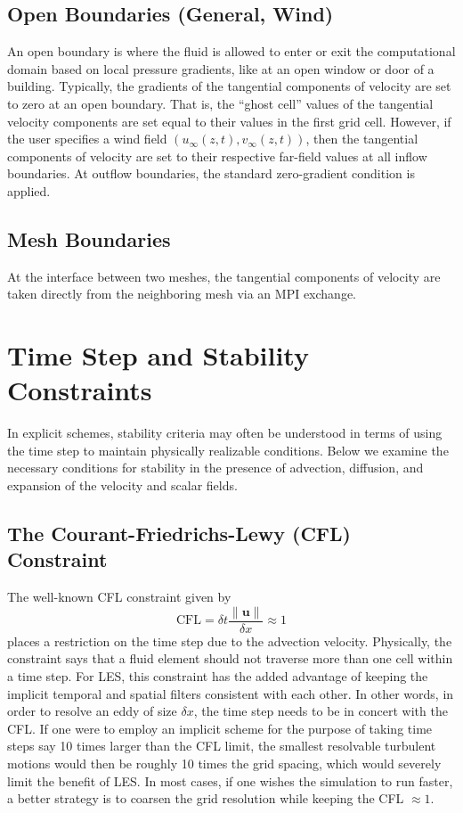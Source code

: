 \subsection{Open Boundaries (General, Wind)}
\label{sec:opentang}

An open boundary is where the fluid is allowed to enter or exit the computational domain based on local pressure gradients, like at an open window or door of a building. Typically, the gradients of the tangential components of velocity are set to zero at an open boundary. That is, the ``ghost cell'' values of the tangential velocity components are set equal to their values in the first grid cell. However, if the user specifies a wind field $(u_\infty(z,t),v_\infty(z,t))$, then the tangential components of velocity are set to their respective far-field values at all inflow boundaries. At outflow boundaries, the standard zero-gradient condition is applied.

\subsection{Mesh Boundaries}

At the interface between two meshes, the tangential components of velocity are taken directly from the neighboring mesh via an MPI exchange.




\newpage
\section{Time Step and Stability Constraints}
\label{stability}

In explicit schemes, stability criteria may often be understood in terms of using the time step to maintain physically realizable conditions.  Below we examine the necessary conditions for stability in the presence of advection, diffusion, and expansion of the velocity and scalar fields.

\subsection{The Courant-Friedrichs-Lewy (CFL) Constraint}

The well-known CFL constraint given by
\begin{equation}
\mbox{CFL} = \delta t \frac{\|\mathbf{u}\|}{\delta x} \approx 1
\end{equation}
places a restriction on the time step due to the advection velocity. Physically, the constraint says that a fluid element should not traverse more than one cell within a time step. For LES, this constraint has the added advantage of keeping the implicit temporal and spatial filters consistent with each other.  In other words, in order to resolve an eddy of size $\delta x$, the time step needs to be in concert with the CFL.  If one were to employ an implicit scheme for the purpose of taking time steps say 10 times larger than the CFL limit, the smallest resolvable turbulent motions would then be roughly 10 times the grid spacing, which would severely limit the benefit of LES.  In most cases, if one wishes the simulation to run faster, a better strategy is to coarsen the grid resolution while keeping the CFL $\approx 1$.

